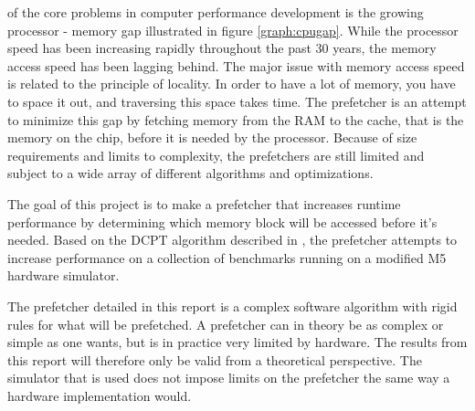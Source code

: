  of the core problems in computer performance development is the growing processor - memory gap illustrated in figure \ref{graph:cpugap}. While the processor speed has been increasing rapidly throughout the past 30 years, the memory access speed has been lagging behind. The major issue with memory access speed is related to the principle of locality. In order to have a lot of memory, you have to space it out, and traversing this space takes time. The prefetcher is an attempt to minimize this gap by fetching memory from the RAM to the cache, that is the memory on the chip, before it is needed by the processor. Because of size requirements and limits to complexity, the prefetchers are still limited and subject to a wide array of different algorithms and optimizations.

The goal of this project is to make a prefetcher that increases runtime performance by determining which memory block will be accessed before it's needed. Based on the DCPT algorithm described in \cite{reference:jahre}, the prefetcher attempts to increase performance on a collection of benchmarks running on a modified M5 hardware simulator. 

The prefetcher detailed in this report is a complex software algorithm with rigid rules for what will be prefetched. A prefetcher can in theory be as complex or simple as one wants, but is in practice very limited by hardware. The results from this report will therefore only be valid from a theoretical perspective. The simulator that is used does not impose limits on the prefetcher the same way a hardware implementation would.
